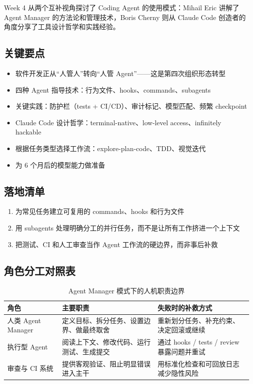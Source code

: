 \documentclass[a4paper]{article}
\begin{document}
Week 4 从两个互补视角探讨了 Coding Agent 的使用模式：Mihail Eric 讲解了 Agent Manager 的方法论和管理技术，Boris Cherny 则从 Claude Code 创造者的角度分享了工具设计哲学和实践经验。

\subsection{关键要点}

\begin{itemize}
    \item 软件开发正从``人管人''转向``人管 Agent''——这是第四次组织形态转型
    \item 四种 Agent 指导技术：行为文件、hooks、commands、subagents
    \item 关键实践：防护栏（tests + CI/CD）、审计标记、模型匹配、频繁 checkpoint
    \item Claude Code 设计哲学：terminal-native、low-level access、infinitely hackable
    \item 根据任务类型选择工作流：explore-plan-code、TDD、视觉迭代
    \item 为 6 个月后的模型能力做准备
\end{itemize}

\subsection{落地清单}

\begin{enumerate}
    \item 为常见任务建立可复用的 commands、hooks 和行为文件
    \item 用 subagents 处理明确分工的并行任务，而不是让所有工作挤进一个上下文
    \item 把测试、CI 和人工审查当作 Agent 工作流的硬边界，而非事后补救
\end{enumerate}

\subsection{角色分工对照表}

\begin{table}[H]
\centering
\begin{tabular}{p{} p{} p{}}
\toprule
角色 & 主要职责 & 失败时的补救方式 \\
\midrule
人类 Agent Manager & 定义目标、拆分任务、设置边界、做最终取舍 & 重新划分任务、补充约束、决定回滚或继续 \\
执行型 Agent & 阅读上下文、修改代码、运行测试、生成提交 & 通过 hooks / tests / review 暴露问题并重试 \\
审查与 CI 系统 & 提供客观验证、阻止明显错误进入主干 & 用标准化检查和可回放日志减少隐性风险 \\
\bottomrule
\end{tabular}
\caption{Agent Manager 模式下的人机职责边界}
\end{table}
\end{document}
